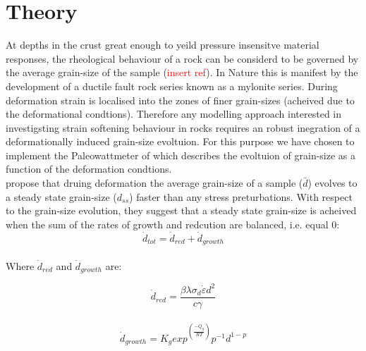 \documentclass[]{scrreprt}
\begin{document}
\section{Theory}
\label{section:theory_size_sensitivity}


At depths in the crust great enough to yeild pressure insensitve material responses, the rheological behaviour of a rock can be considerd to be governed by the average grain-size of the sample (\textcolor{red}{insert ref}). In Nature this is manifest by the development of a ductile fault rock series known as a mylonite series. During deformation strain is localised into the zones of finer grain-sizes (acheived due to the deformational condtions). Therefore any modelling approach interested in investigsting strain softening behaviour in rocks requires an robust inegration of a deformationally induced grain-size evoltuion. For this purpose we have chosen to implement the Paleowattmeter of \citep{Austin2007} which describes the evoltuion of grain-size as a function of the deformation condtions.\\  

\citet{Austin2007} propose that druing deformation the average grain-size of a sample ($\bar{d}$) evolves to a steady state grain-size ($d_{ss}$) faster than any stress preturbations. With respect to the grain-size evolution, they suggest that a steady state grain-size is acheived when the sum of the rates of growth and redcution are balanced, i.e. equal 0:\\

\begin{equation}
 \label{eq:rate_change_dss}
\dot{d}_{tot} = \dot{d}_{red} + \dot{d}_{growth}
\end{equation}\\

Where $\dot{d}_{red}$ and $\dot{d}_{growth}$ are:

\begin{equation}
 \label{eq:d_red}
\dot{d}_{red}=\frac{\beta\lambda\sigma_{d}\dot{\varepsilon}d^2}{c\gamma}
\end{equation}\\

\begin{equation}
 \label{eq:d_growth}
\dot{d}_{growth}=K_g exp^{\left(\frac{-Q_g}{RT}\right)} p^{-1} d^{1-p} 	
\end{equation}\\
\end{document}
